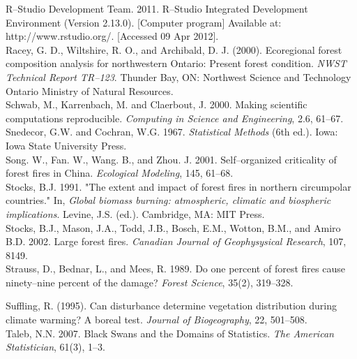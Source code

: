 \begin{spacing}{1.5}
\noindent R--Studio Development Team. 2011. R--Studio Integrated Development Environment (Version 2.13.0). [Computer program] Available at: http://www.rstudio\linebreak .org/. [Accessed 09 Apr 2012].\\

\noindent Racey, G. D., Wiltshire, R. O., and Archibald, D. J. (2000). Ecoregional forest composition analysis for northwestern Ontario: Present forest condition. \emph{NWST Technical Report TR--123}. Thunder Bay, ON: Northwest Science and Technology Ontario Ministry of Natural Resources.\\

\noindent Schwab, M., Karrenbach, M. and Claerbout, J. 2000. Making scientific computations reproducible. \emph{Computing in Science and Engineering}, 2.6, 61--67.\\

\noindent Snedecor, G.W. and Cochran, W.G. 1967. \emph{Statistical Methods} (6th ed.). Iowa: Iowa State University Press.\\

\noindent Song. W., Fan. W., Wang. B., and Zhou. J. 2001. Self--organized criticality of forest fires in China. \emph{Ecological Modeling}, 145, 61--68.\\

\noindent Stocks, B.J. 1991. "The extent and impact of forest fires in northern circumpolar countries." In, \emph{Global biomass burning: atmospheric, climatic and biospheric implications}. Levine, J.S. (ed.). Cambridge, MA: MIT Press.\\

\noindent Stocks, B.J., Mason, J.A., Todd, J.B., Bosch, E.M., Wotton, B.M., and Amiro B.D. 2002. Large forest fires. \emph{Canadian Journal of Geophysysical Research}, 107, 8149.\\

\noindent Strauss, D., Bednar, L., and Mees, R. 1989. Do one percent of forest fires cause ninety--nine percent of the damage? \emph{Forest Science}, 35(2), 319--328.\\

\clearpage

\noindent Suffling, R. (1995). Can disturbance determine vegetation distribution during climate warming? A boreal test. \emph{Journal of Biogeography}, 22, 501--508.\\

\noindent Taleb, N.N. 2007. Black Swans and the Domains of Statistics. \emph{The American Statistician}, 61(3), 1--3.\\


\end{spacing}

